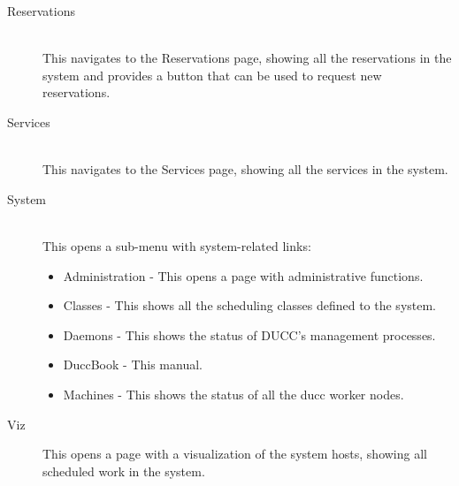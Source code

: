 \begin{description}
          \item[Reservations] \hfill \\
            This navigates to the Reservations page, showing all the reservations
            in the system and provides a button that can be used to request new reservations. 

          \item[Services] \hfill \\
            This navigates to the Services page, showing all the services in the
            system.

          \item[System] \hfill \\
            This opens a sub-menu with system-related links:
            \begin{itemize}
              \item Administration - This opens a page with administrative functions. 
              \item Classes - This shows all the scheduling classes defined to the system. 
              \item Daemons - This shows the status of DUCC's management processes. 
              \item DuccBook - This manual. 
              \item Machines - This shows the status of all the ducc worker nodes. 
            \end{itemize}

            \item[Viz]
            This opens a page with a visualization of the system hosts, showing all
            scheduled work in the system.
      \end{description}              

      \ifpdf
      \else
      \fi
      

      \ifpdf
      \else
      \fi
      

      \ifpdf
      \else
      \fi
      

      \ifpdf
      \else
      \fi
      

